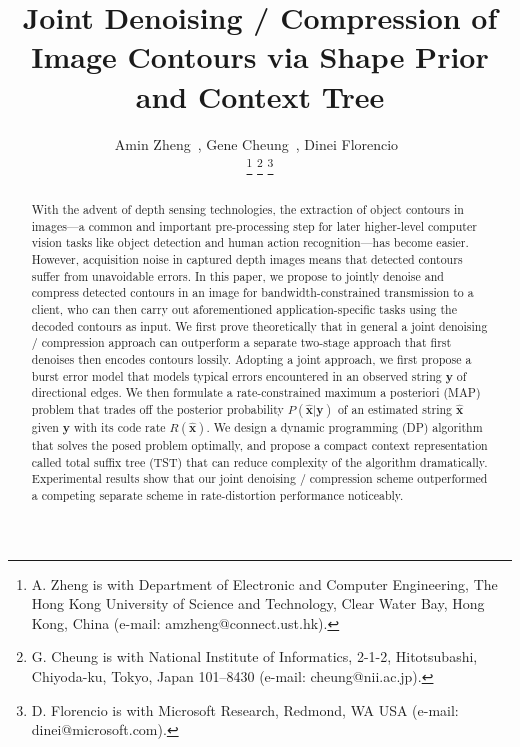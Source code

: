 \documentclass[10pt,twocolumn,twoside]{IEEEtran}
\renewcommand{\vec}[1]{\mathbf{#1}}
\begin{document}
\title{Joint Denoising / Compression of Image Contours via Shape Prior and Context Tree}

\author{
Amin Zheng~,
Gene Cheung~,
Dinei Florencio~
\begin{small}
\thanks{A. Zheng is with 
        Department of Electronic and Computer Engineering, 
        The Hong Kong University of Science and Technology, 
        Clear Water Bay, Hong Kong, China
        (e-mail: amzheng@connect.ust.hk).}
        \thanks{G. Cheung is with 
        National Institute of Informatics, 2-1-2, Hitotsubashi, Chiyoda-ku,
        Tokyo, Japan 101--8430 
        (e-mail: cheung@nii.ac.jp).}
        \thanks{D. Florencio is with  
        Microsoft Research,
        Redmond, WA USA 
        (e-mail: dinei@microsoft.com).}
\end{small}
}%
\maketitle
\vspace{0.1in}

\begin{abstract}
With the advent of depth sensing technologies, the extraction of object contours in images---a common and important pre-processing step for later higher-level computer vision tasks like object detection and human action recognition---has become easier. 
However, acquisition noise in captured depth images means that detected contours suffer from unavoidable errors. 
In this paper, we propose to jointly denoise and compress detected contours in an image for bandwidth-constrained transmission to a client, who can then carry out aforementioned application-specific tasks using the decoded contours as input.
We first prove theoretically that in general a joint denoising / compression approach can outperform a separate two-stage approach that first denoises then encodes contours lossily.
Adopting a joint approach, we first propose a burst error model that models typical errors encountered in an observed string $\vec{y}$ of directional edges.
We then formulate a rate-constrained maximum a posteriori (MAP) problem that trades off the posterior probability $P(\hat{\vec{x}} | \vec{y})$ of an estimated string $\hat{\vec{x}}$ given $\vec{y}$ with its code rate $R(\hat{\vec{x}})$. 
We design a dynamic programming (DP) algorithm that solves the posed problem optimally, and propose a compact context representation called total suffix tree (TST) that can reduce complexity of the algorithm dramatically.
Experimental results show that our joint denoising / compression scheme outperformed a competing separate scheme in rate-distortion performance noticeably.
\end{abstract}
\end{document}
